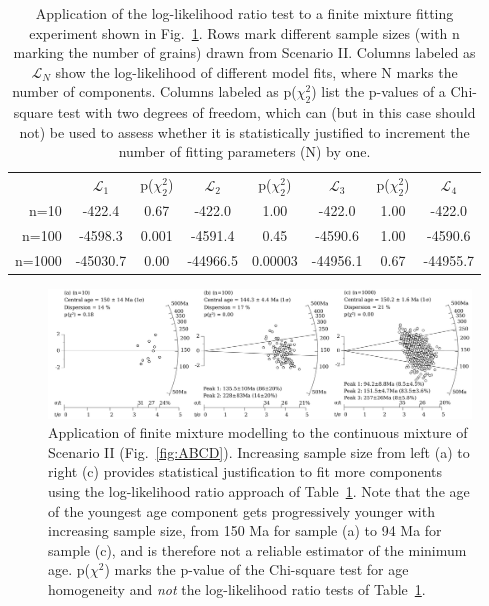 \documentclass{article}
\begin{document}
\begin{table}
\centering
\begin{tabular}{r|ccccccc}
       & $\mathcal{L}_1$  & p($\chi^2_2$) & $\mathcal{L}_2$  &  p($\chi^2_2$) & 
         $\mathcal{L}_3$ & p($\chi^2_2$) & $\mathcal{L}_4$   \\
n=10   & -422.4   & 0.67 & -422.0   & 1.00 & -422.0   & 1.00 & -422.0 \\
n=100  & -4598.3  & 0.001 & -4591.4  & 0.45 & -4590.6  & 1.00 & -4590.6 \\
n=1000 & -45030.7 & 0.00 & -44966.5 & 0.00003 & -44956.1 & 0.67 & -44955.7 \\
\end{tabular}
\caption{Application of the log-likelihood ratio test to a finite
  mixture fitting experiment shown in Fig.~\ref{fig:mixtures}. Rows
  mark different sample sizes (with n marking the number of grains)
  drawn from Scenario II. Columns labeled as $\mathcal{L}_N$ show the
  log-likelihood of different model fits, where N marks the number of
  components. Columns labeled as p($\chi^2_2$) list the p-values of a
  Chi-square test with two degrees of freedom, which can (but in this
  case should not) be used to assess whether it is statistically
  justified to increment the number of fitting parameters (N) by one.}
\label{tab:Lratio}
\end{table}

\begin{figure}[!ht]
\includegraphics[width=\textwidth]{mixtures.png}
\caption{Application of finite mixture modelling to the continuous
  mixture of Scenario II (Fig.~\ref{fig:ABCD}). Increasing sample size
  from left (a) to right (c) provides statistical justification to fit
  more components using the log-likelihood ratio approach of
  Table~\ref{tab:Lratio}.  Note that the age of the youngest age
  component gets progressively younger with increasing sample size,
  from 150 Ma for sample (a) to 94 Ma for sample (c), and is therefore
  not a reliable estimator of the minimum age. p($\chi^2$) marks the
  p-value of the Chi-square test for age homogeneity and \emph{not}
  the log-likelihood ratio tests of Table~\ref{tab:Lratio}.}
\label{fig:mixtures}
\end{figure}
\end{document}

